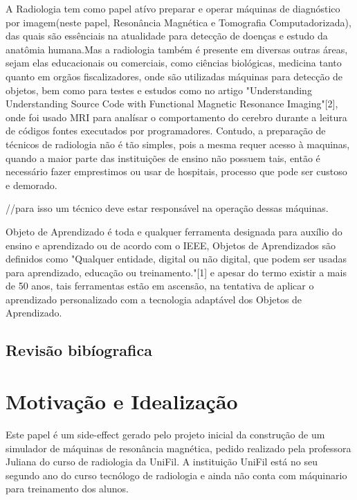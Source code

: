 \documentclass[12pt,openright,oneside,a4paper,english,french,spanish,brazil]{unifil}
\begin{document}
A Radiologia tem como papel atívo preparar e operar máquinas de diagnóstico por imagem(neste papel, Resonância Magnética e Tomografia Computadorizada), das quais são essênciais na atualidade para detecção de doenças e estudo da anatômia humana.Mas a radiologia também é presente em diversas outras áreas, sejam elas educacionais ou comerciais, como ciências biológicas, medicina tanto quanto em orgãos fiscalizadores, onde são utilizadas máquinas para detecção de objetos, bem como para testes e estudos como no artigo "Understanding Understanding Source Code with Functional Magnetic Resonance Imaging"[2], onde foi usado MRI para analísar o comportamento do cerebro durante a leitura de códigos fontes executados por programadores.
Contudo, a preparação de técnicos de radiologia não é tão simples, pois a mesma requer acesso à maquinas, quando a maior parte das instituições de ensino não possuem tais, então é necessário fazer emprestimos ou usar de hospitais, processo que pode ser custoso e demorado.

//para isso um técnico deve estar responsável na operação dessas máquinas.

Objeto de Aprendizado é toda e qualquer ferramenta designada para auxílio do ensino e aprendizado ou de acordo com o IEEE, Objetos de Aprendizados são definidos como "Qualquer entidade, digital ou não digital, que podem ser usadas para aprendizado, educação ou treinamento."[1] e apesar do termo existir a mais de 50 anos, tais ferramentas estão em ascensão, na tentativa de aplicar o aprendizado personalizado com a tecnologia adaptável dos Objetos de Aprendizado. %

\section{Revisão bibíografica}%


\chapter{Motivação e Idealização}%

Este papel é um side-effect gerado pelo projeto inicial da construção de um simulador de máquinas de resonância magnética, pedido realizado pela professora Juliana do curso de radiologia da UniFil. A instituição UniFil está no seu segundo ano do curso tecnólogo de radiologia e ainda não conta com máquinario para treinamento dos alunos.
\end{document}
